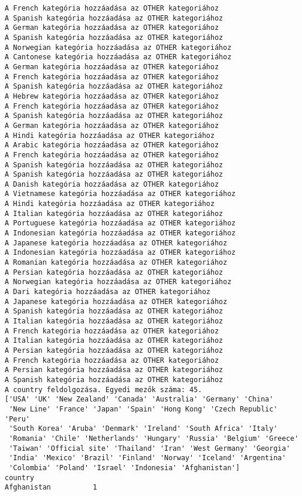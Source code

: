 \documentclass[11pt]{article}
\begin{document}
\begin{Verbatim}[commandchars=\\\{\}]
A French kategória hozzáadása az OTHER kategoriához
A Spanish kategória hozzáadása az OTHER kategoriához
A German kategória hozzáadása az OTHER kategoriához
A Spanish kategória hozzáadása az OTHER kategoriához
A Norwegian kategória hozzáadása az OTHER kategoriához
A Cantonese kategória hozzáadása az OTHER kategoriához
A German kategória hozzáadása az OTHER kategoriához
A French kategória hozzáadása az OTHER kategoriához
A Spanish kategória hozzáadása az OTHER kategoriához
A Hebrew kategória hozzáadása az OTHER kategoriához
A French kategória hozzáadása az OTHER kategoriához
A Spanish kategória hozzáadása az OTHER kategoriához
A German kategória hozzáadása az OTHER kategoriához
A Hindi kategória hozzáadása az OTHER kategoriához
A Arabic kategória hozzáadása az OTHER kategoriához
A French kategória hozzáadása az OTHER kategoriához
A Spanish kategória hozzáadása az OTHER kategoriához
A Spanish kategória hozzáadása az OTHER kategoriához
A Danish kategória hozzáadása az OTHER kategoriához
A Vietnamese kategória hozzáadása az OTHER kategoriához
A Hindi kategória hozzáadása az OTHER kategoriához
A Italian kategória hozzáadása az OTHER kategoriához
A Portuguese kategória hozzáadása az OTHER kategoriához
A Indonesian kategória hozzáadása az OTHER kategoriához
A Japanese kategória hozzáadása az OTHER kategoriához
A Indonesian kategória hozzáadása az OTHER kategoriához
A Romanian kategória hozzáadása az OTHER kategoriához
A Persian kategória hozzáadása az OTHER kategoriához
A Norwegian kategória hozzáadása az OTHER kategoriához
A Dari kategória hozzáadása az OTHER kategoriához
A Japanese kategória hozzáadása az OTHER kategoriához
A Spanish kategória hozzáadása az OTHER kategoriához
A Italian kategória hozzáadása az OTHER kategoriához
A French kategória hozzáadása az OTHER kategoriához
A Italian kategória hozzáadása az OTHER kategoriához
A Persian kategória hozzáadása az OTHER kategoriához
A French kategória hozzáadása az OTHER kategoriához
A Persian kategória hozzáadása az OTHER kategoriához
A Spanish kategória hozzáadása az OTHER kategoriához
A country feldolgozása. Egyedi mezők száma: 45.
['USA' 'UK' 'New Zealand' 'Canada' 'Australia' 'Germany' 'China'
 'New Line' 'France' 'Japan' 'Spain' 'Hong Kong' 'Czech Republic' 'Peru'
 'South Korea' 'Aruba' 'Denmark' 'Ireland' 'South Africa' 'Italy'
 'Romania' 'Chile' 'Netherlands' 'Hungary' 'Russia' 'Belgium' 'Greece'
 'Taiwan' 'Official site' 'Thailand' 'Iran' 'West Germany' 'Georgia'
 'India' 'Mexico' 'Brazil' 'Finland' 'Norway' 'Iceland' 'Argentina'
 'Colombia' 'Poland' 'Israel' 'Indonesia' 'Afghanistan']
country
Afghanistan          1

\end{Verbatim}
\end{document}
